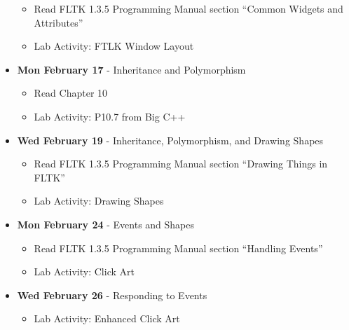 \begin{itemize}
    \begin{itemize}
        \item Read FLTK 1.3.5 Programming Manual section ``Common
            Widgets and Attributes''
        \item Lab Activity: FTLK Window Layout
    \end{itemize}
\item\textbf{Mon February 17} - Inheritance and Polymorphism
    \begin{itemize}
        \item Read Chapter 10
        \item Lab Activity: P10.7 from Big C++
    \end{itemize}
\item\textbf{Wed February 19} - Inheritance, Polymorphism, and Drawing Shapes
    \begin{itemize}
        \item Read FLTK 1.3.5 Programming Manual section ``Drawing Things in FLTK''
        \item Lab Activity: Drawing Shapes
    \end{itemize}
\item\textbf{Mon February 24} - Events and Shapes
    \begin{itemize}
        \item Read FLTK 1.3.5 Programming Manual section ``Handling Events''
        \item Lab Activity: Click Art
    \end{itemize}
\item\textbf{Wed February 26} - Responding to Events
    \begin{itemize}
        \item Lab Activity: Enhanced Click Art
    \end{itemize}
\end{itemize}
\hrulefill

